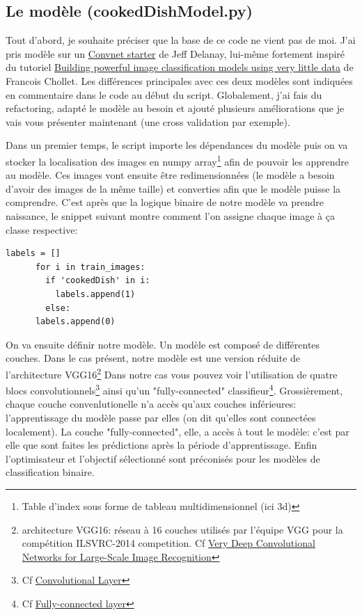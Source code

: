 \documentclass[a4paper,12pt]{report}
\begin{document}
      \subsection{Le modèle (cookedDishModel.py)}
      Tout d'abord, je souhaite préciser que la base de ce code ne vient pas de moi. J'ai pris modèle sur un \href{<https://www.kaggle.com/vshevche/dogs-vs-cats-redux-kernels-edition/catdognet-keras-convnet-starter/run/790364>}{Convnet starter} de Jeff Delanay, lui-même fortement inspiré du tutoriel \href{<https://blog.keras.io/building-powerful-image-classification-models-using-very-little-data.html>}{Building powerful image classification models using very little data} de Francois Chollet.
      \medbreak
      Les différences principales avec ces deux modèles sont indiquées en commentaire dans le code au début du script. Globalement, j'ai fais du refactoring, adapté le modèle au besoin et ajouté plusieurs améliorations que je vais vous présenter maintenant (une cross validation par exemple).
      \bigbreak

      Dans un premier temps, le script importe les dépendances du modèle puis on va stocker la localisation des images en numpy array\footnote{Table d'index sous forme de tableau multidimensionnel (ici 3d)} afin de pouvoir les apprendre au modèle. Ces images vont ensuite être redimensionnées (le modèle a besoin d'avoir des images de la même taille) et converties afin que le modèle puisse la comprendre.
      \medbreak
      C'est après que la logique binaire de notre modèle va prendre naissance, le snippet suivant montre comment l'on assigne chaque image à ça classe respective:
      \begin{lstlisting}[title=cookedDishModel.py (l.96)]
      labels = []
      for i in train_images:
        if 'cookedDish' in i:
          labels.append(1)
        else:
      labels.append(0)
      \end{lstlisting}
      \medbreak
      On va ensuite définir notre modèle. Un modèle est composé de différentes couches. Dans le cas présent, notre modèle est une version réduite de l'architecture VGG16\footnote{architecture VGG16: réseau à 16 couches utilisés par l'équipe VGG pour la compétition ILSVRC-2014 competition. Cf \href{<https://arxiv.org/abs/1409.1556>}{Very Deep Convolutional Networks for Large-Scale Image Recognition}}
      \medbreak
      Dans notre cas vous pouvez voir l'utilisation de quatre blocs convolutionnels\footnote{Cf \href{<https://cs231n.github.io/convolutional-networks/\#conv>}{Convolutional Layer}} ainsi qu'un "fully-connected" classifieur\footnote{Cf \href{<https://cs231n.github.io/convolutional-networks/\#fc>}{Fully-connected layer}}. Grossièrement, chaque couche convenlutionelle n'a accès qu'aux couches inférieures: l'apprentissage du modèle passe par elles (on dit qu'elles sont connectées localement). La couche "fully-connected", elle, a accès à tout le modèle: c'est par elle que sont faites les prédictions après la période d'apprentissage. Enfin l'optimisateur et l'objectif sélectionné sont préconisés pour les modèles de classification binaire.
\end{document}
